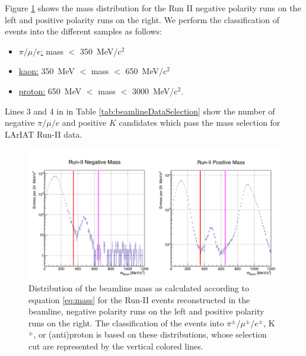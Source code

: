 Figure \ref{fig:mass} shows the mass distribution for the Run II negative polarity runs on the left and positive polarity runs on the right. We perform the classification of events into the different samples as follows:

\begin{itemize}
\item \underline{$\pi/\mu/e$:}  mass $<$ 350~MeV/c$^2$

\item \underline{kaon:} 350~MeV $<$ mass $<$ 650~MeV/c$^2$

\item \underline{proton:} 650~MeV $<$ mass $<$ 3000~MeV/c$^2$.

\end{itemize}

Lines 3 and 4 in in Table \ref{tab:beamlineDataSelection} show the number of negative $\pi/\mu/e$ and positive $K$ candidates which pass the mass selection for LArIAT Run-II data.

\begin{figure}
  \centering  
\includegraphics[width=\textwidth]{Chapter-4/Images/massRunII.png}
\caption{Distribution of the beamline mass as calculated according to equation \ref{eq:mass} for the Run-II events reconstructed in the beamline, negative polarity runs on the left and positive polarity runs on the right. The classification of the events into $\pi^\pm/ \mu^\pm/e^\pm$, K$^\pm$, or (anti)proton is based on these distributions, whose selection cut are represented by the vertical colored lines.}
\label{fig:mass}
\end{figure}

